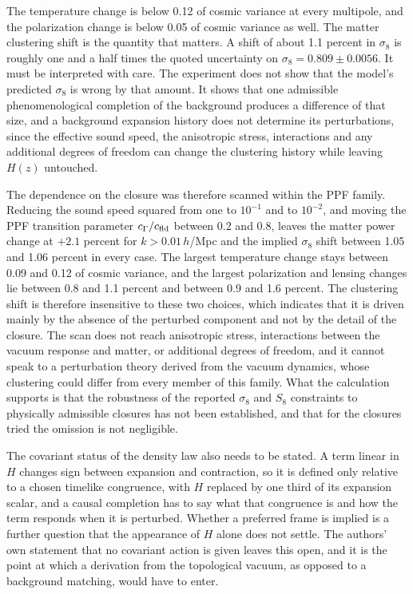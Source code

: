 \documentclass[11pt]{article}
\begin{document}
The temperature change is below 0.12 of cosmic variance at every multipole, and the polarization change is below 0.05 of cosmic variance as well. The matter clustering shift is the quantity that matters. A shift of about 1.1 percent in $\sigma_8$ is roughly one and a half times the quoted uncertainty on $\sigma_8=0.809\pm0.0056$. It must be interpreted with care. The experiment does not show that the model's predicted $\sigma_8$ is wrong by that amount. It shows that one admissible phenomenological completion of the background produces a difference of that size, and a background expansion history does not determine its perturbations, since the effective sound speed, the anisotropic stress, interactions and any additional degrees of freedom can change the clustering history while leaving $H(z)$ untouched.

The dependence on the closure was therefore scanned within the PPF family. Reducing the sound speed squared from one to $10^{-1}$ and to $10^{-2}$, and moving the PPF transition parameter $c_\Gamma/c_{\rm fld}$ between 0.2 and 0.8, leaves the matter power change at $+2.1$ percent for $k>0.01\,h$/Mpc and the implied $\sigma_8$ shift between 1.05 and 1.06 percent in every case. The largest temperature change stays between 0.09 and 0.12 of cosmic variance, and the largest polarization and lensing changes lie between 0.8 and 1.1 percent and between 0.9 and 1.6 percent. The clustering shift is therefore insensitive to these two choices, which indicates that it is driven mainly by the absence of the perturbed component and not by the detail of the closure. The scan does not reach anisotropic stress, interactions between the vacuum response and matter, or additional degrees of freedom, and it cannot speak to a perturbation theory derived from the vacuum dynamics, whose clustering could differ from every member of this family. What the calculation supports is that the robustness of the reported $\sigma_8$ and $S_8$ constraints to physically admissible closures has not been established, and that for the closures tried the omission is not negligible.

The covariant status of the density law also needs to be stated. A term linear in $H$ changes sign between expansion and contraction, so it is defined only relative to a chosen timelike congruence, with $H$ replaced by one third of its expansion scalar, and a causal completion has to say what that congruence is and how the term responds when it is perturbed. Whether a preferred frame is implied is a further question that the appearance of $H$ alone does not settle. The authors' own statement that no covariant action is given leaves this open, and it is the point at which a derivation from the topological vacuum, as opposed to a background matching, would have to enter.
\end{document}
